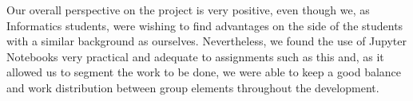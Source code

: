 \documentclass[extendedabs]{recpad2k}
\begin{document}
Our overall perspective on the project is very positive, even though we, as Informatics students, were wishing to find advantages on the side of the 
students with a similar background as ourselves.
Nevertheless, we found the use of Jupyter Notebooks very practical and adequate to assignments such as this and, as it allowed us to segment the work to be done,
we were able to keep a good balance and work distribution between group elements throughout the development.




\end{document}
